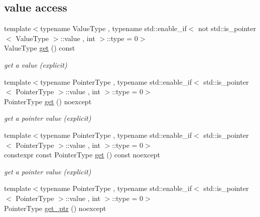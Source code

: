 \subsection*{value access}
\begin{DoxyCompactItemize}
\item 
{\footnotesize template$<$typename Value\+Type , typename std\+::enable\+\_\+if$<$                                                              not std\+::is\+\_\+pointer$<$ Value\+Type $>$\+::value                                                           , int $>$\+::type  = 0$>$ }\\Value\+Type \hyperlink{a00025_a20bfb2ca6d4c421c74bb3e53328cd437}{get} () const 
\begin{DoxyCompactList}\small\item\em get a value (explicit) \end{DoxyCompactList}\item 
{\footnotesize template$<$typename Pointer\+Type , typename std\+::enable\+\_\+if$<$                                                              std\+::is\+\_\+pointer$<$ Pointer\+Type $>$\+::value                                                           , int $>$\+::type  = 0$>$ }\\Pointer\+Type \hyperlink{a00025_ac5693cff1df0775cd3fbe960412cde4b}{get} () noexcept
\begin{DoxyCompactList}\small\item\em get a pointer value (explicit) \end{DoxyCompactList}\item 
{\footnotesize template$<$typename Pointer\+Type , typename std\+::enable\+\_\+if$<$                                                              std\+::is\+\_\+pointer$<$ Pointer\+Type $>$\+::value                                                           , int $>$\+::type  = 0$>$ }\\constexpr const Pointer\+Type \hyperlink{a00025_a363da77bc39cae041d59ee334ac4f41b}{get} () const  noexcept
\begin{DoxyCompactList}\small\item\em get a pointer value (explicit) \end{DoxyCompactList}\item 
{\footnotesize template$<$typename Pointer\+Type , typename std\+::enable\+\_\+if$<$                                                              std\+::is\+\_\+pointer$<$ Pointer\+Type $>$\+::value                                                           , int $>$\+::type  = 0$>$ }\\Pointer\+Type \hyperlink{a00025_a7ab11375ed2e29c2fcb6119386851445}{get\+\_\+ptr} () noexcept

\end{DoxyCompactItemize}

